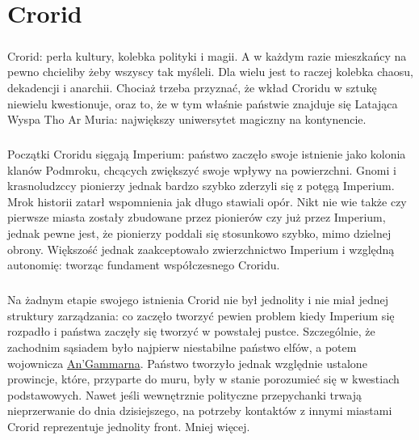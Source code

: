 \chapter{Crorid}
\label{Crorid}

\paragraph{}
Crorid: perła kultury, kolebka polityki i magii.
A w każdym razie mieszkańcy na pewno chcieliby żeby wszyscy tak myśleli.
Dla wielu jest to raczej kolebka chaosu, dekadencji i anarchii.
Chociaż trzeba przyznać, że wkład Croridu w sztukę niewielu kwestionuje, oraz to, że w tym właśnie państwie znajduje się Latająca Wyspa Tho Ar Muria: największy uniwersytet magiczny na kontynencie.

\paragraph{}
Początki Croridu sięgają Imperium: państwo zaczęło swoje istnienie jako kolonia klanów Podmroku, chcących zwiększyć swoje wpływy na powierzchni.
Gnomi i krasnoludzccy pionierzy jednak bardzo szybko zderzyli się z potęgą Imperium.
Mrok historii zatarł wspomnienia jak długo stawiali opór.
Nikt nie wie także czy pierwsze miasta zostały zbudowane przez pionierów czy już przez Imperium, jednak pewne jest, że pionierzy poddali się stosunkowo szybko, mimo dzielnej obrony.
Większość jednak zaakceptowało zwierzchnictwo Imperium i względną autonomię: tworząc fundament współczesnego Croridu.

\paragraph{}
Na żadnym etapie swojego istnienia Crorid nie był jednolity i nie miał jednej struktury zarządzania: co zaczęło tworzyć pewien problem kiedy Imperium się rozpadło i państwa zaczęły się tworzyć w powstałej pustce.
Szczególnie, że zachodnim sąsiadem było najpierw niestabilne państwo elfów, a potem wojownicza \hyperref[AnGamarrna]{An'Gammarna}.
Państwo tworzyło jednak względnie ustalone prowincje, które, przyparte do muru, były w stanie porozumieć się w kwestiach podstawowych. Nawet jeśli wewnętrznie polityczne przepychanki trwają nieprzerwanie do dnia dzisiejszego, na potrzeby kontaktów z innymi miastami Crorid reprezentuje jednolity front.
Mniej więcej.

